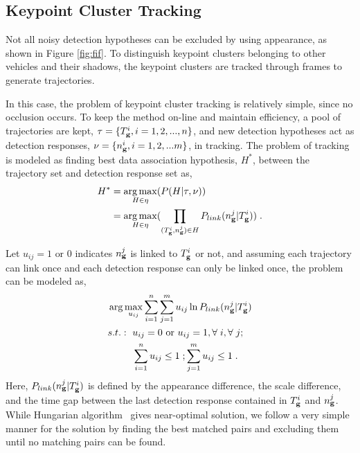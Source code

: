 \subsection{Keypoint Cluster Tracking}
Not all noisy detection hypotheses can be excluded by using appearance, as shown in Figure \ref{fig:fif}. To distinguish keypoint clusters belonging to other vehicles and their shadows, the keypoint clusters are tracked through frames to generate trajectories.

In this case, the problem of keypoint cluster tracking  is relatively simple, since no occlusion occurs. To keep the method on-line and maintain efficiency, a pool of trajectories are kept, $\tau=\{T_{\bf{g}}^i,i=1,2,...,n\}$, and new detection hypotheses act as detection responses, $\nu=\{n_{\bf{g}}^i,i=1,2,...m\}$, in tracking. The problem of tracking is modeled as finding best data association hypothesis, $H^*$, between the trajectory set and detection response set as,
\begin{equation}
\begin{aligned}
{H^*} &= \mathop {\arg \max }\limits_{H \in \eta
} (P(H|\tau,\nu )) \\
&= \mathop {\arg \max }\limits_{H \in \eta }
(\prod\limits_{(T_{\bf{g}}^i,n_{\bf{g}}^j) \in H} {P_{link}(n_{\bf{g}}^j|T_{\bf{g}}^i)} ) \;.
\end{aligned}
\label{eq3}
\end{equation}

Let $u_{ij}=1 \mbox{ or } 0$ indicates $n_{\bf{g}}^j$ is linked to $T_{\bf{g}}^i$ or not, and assuming each trajectory can link once and each detection response can only be linked once, the problem can be modeled as,
\[
\begin{aligned}
&\arg \max\limits_{u_{ij}} \sum\limits_{i = 1}^n \sum\limits_{j = 1}^m u_{ij} \ln P_{link}(n_{\bf{g}}^j|T_{\bf{g}}^i)\\
&
\begin{aligned}
    s.t.:\mbox{ }&u_{ij}=0\mbox{ or }u_{ij}=1,\forall\;i,\forall\;j;\\
    &\sum\limits_{i = 1}^n {u_{ij}} \leq 1\;; \sum\limits_{j = 1}^m {u_{ij}}\leq 1\;.
\end{aligned}
\end{aligned}
\]
Here, $P_{link}(n_{\bf{g}}^j|T_{\bf{g}}^i)$ is defined by the appearance difference, the scale difference, and the time gap between the last detection response contained in $T_{\bf{g}}^i$ and $n_{\bf{g}}^j$. While Hungarian algorithm~\citep{ha} gives near-optimal solution, we follow a very simple manner for the solution by finding the best matched pairs and excluding them until no matching pairs can be found.

